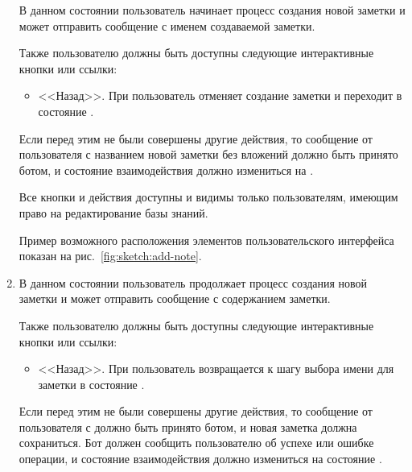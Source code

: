 \begin{enumerate}
            В данном состоянии пользователь начинает процесс создания новой заметки и может
            отправить сообщение с именем создаваемой заметки.

            Также пользователю должны быть доступны следующие интерактивные кнопки или ссылки:
            \begin{itemize}
                \item
                    <<Назад>>.
                    При  пользователь отменяет создание заметки и
                    переходит в состояние
                    \hyperref[itm:req:ui:states:navx]
                    {}.
            \end{itemize}
            
            Если перед этим не были совершены другие действия, то сообщение от пользователя
            с названием новой заметки без вложений должно быть принято ботом, и
            состояние взаимодействия должно измениться на
            \hyperref[itm:req:ui:states:create-notex]
            {}.

            Все кнопки и действия доступны и видимы только пользователям, имеющим право на редактирование
            базы знаний.

            Пример возможного расположения элементов пользовательского интерфейса показан на
            рис.~\ref{fig:sketch:add-note}.

        \item \label{itm:req:ui:states:create-notex}

            В данном состоянии пользователь продолжает процесс создания новой заметки и может
            отправить сообщение с содержанием заметки.

            Также пользователю должны быть доступны следующие интерактивные кнопки или ссылки:
            \begin{itemize}
                \item
                    <<Назад>>.
                    При  пользователь возвращается к шагу выбора имени для заметки
                    в состояние
                    \hyperref[itm:req:ui:states:create-note]
                    {}.
            \end{itemize}
            
            Если перед этим не были совершены другие действия, то сообщение от пользователя
            с должно быть принято ботом, и новая заметка должна сохраниться.
            Бот должен сообщить пользователю об успехе или ошибке операции, и
            состояние взаимодействия должно измениться на состояние
            \hyperref[itm:req:ui:states:navx]
            {}.


\end{enumerate}
